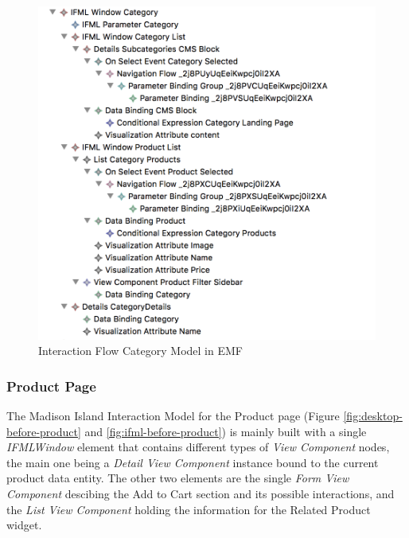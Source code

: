 \vspace{0.5cm}
\begin{figure}[H]
  \centering
    \includegraphics[width=13cm]{images/diagrams/before/ifml-hierarchy-category.png}
  \caption{Interaction Flow Category Model in EMF}
  \label{fig:ifml-before-hierarchy-category}
\end{figure}
\vspace{0.5cm}

\newpage
\subsubsection{Product Page}

The Madison Island Interaction Model for the Product page (Figure \ref{fig:desktop-before-product} and \ref{fig:ifml-before-product}) is mainly built with a single \textit{IFMLWindow} element that contains different types of \textit{View Component} nodes, the main one being a \textit{Detail View Component} instance bound to the current product data entity. The other two elements are the single \textit{Form View Component} descibing the Add to Cart section and its possible interactions, and the \textit{List View Component} holding the information for the Related Product widget.

